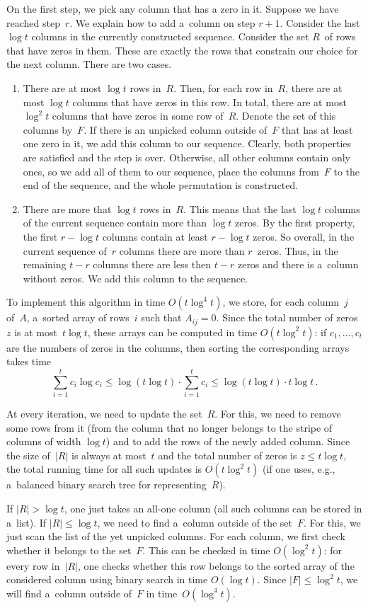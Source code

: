 On the first step, we pick any column that has a zero in it. Suppose
we have reached step~$r$. We explain how to add a~column on
step $r+1$. Consider the last $\log t$ columns in the currently
constructed sequence. Consider the set $R$~of rows that have
zeros in them. These are exactly the rows that constrain our
choice for the next column. There are two cases.
\begin{enumerate}
\item There are at most $\log t$ rows in~$R$. Then, for each row in~$R$, there are at most $\log t$ columns that have zeros in this row. In total, there are at most $\log^2 t$ columns that have zeros in some row of~$R$. Denote the set of this columns by~$F$. If there is an unpicked column outside of~$F$ that has at least one zero in it, we add this column to our sequence. Clearly, both properties are satisfied and the step is over. Otherwise, all other columns contain only ones, so we add all of them to our sequence, place the columns from~$F$ to the end of the sequence, and the whole permutation is constructed.
\item There are more that $\log t$ rows in~$R$. This means that the last $\log t$ columns of the current sequence contain more than $\log t$ zeros. By the first property, the first $r - \log t$ columns contain at least $r - \log t$ zeros. So overall, in the current sequence of~$r$ columns there are more than $r$~zeros. Thus, in the remaining $t-r$ columns there are less then $t-r$ zeros and there is a~column without zeros. We add this column to the sequence.
\end{enumerate}


To implement this algorithm in time $O(t\log^{4}t)$, we store, for each column~$j$ of~$A$, a~sorted array of rows~$i$ such that $A_{ij}=0$. Since the total number of zeros~$z$ is at most~$t\log t$, these arrays can be computed in time $O(t\log^2t)$: if $c_1, \dotsc, c_t$ are the numbers of zeros in the columns, then sorting the corresponding arrays takes time
\[\sum_{i=1}^{t}c_i \log c_i \le \log(t \log t) \cdot \sum_{i=1}^{t}c_i \le \log(t \log t) \cdot t\log t \, .\]

At every iteration, we need to update the set~$R$. For this, we need to remove some rows from it (from the column that no longer belongs to the stripe of columns of width $\log t$) and to add the rows of the newly added column. Since the size of~$|R|$ is always at most~$t$ and the total number of zeros is $z \le t\log t$, the total running time for all such updates is
$O(t\log^2t)$ (if one uses, e.g., a~balanced binary search tree for
representing~$R$).

If $|R| > \log t$, one just takes an all-one column (all such columns
can be stored in a~list). If $|R| \le \log t$, we need to find a~column outside of the set~$F$. For this, we just scan the list of the yet unpicked columns. For each column, we first check whether it belongs to the set~$F$. This can be checked in time $O(\log^2t)$: for every row in~$|R|$, one checks whether this row belongs to the sorted array of the considered column using binary search in time
$O(\log t)$. Since $|F| \le \log^2t$, we will find a~column outside of~$F$ in time~$O(\log^4 t)$.